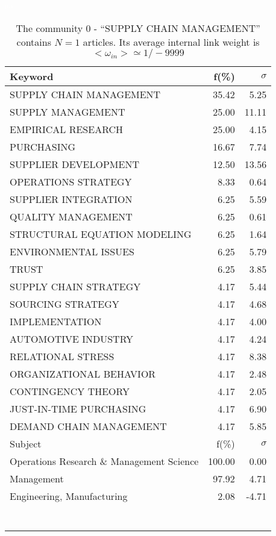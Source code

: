 \documentclass[a4paper,11pt]{report}
\begin{document}
\begin{landscape}
\begin{table}[!ht]
\caption{The community 0 - ``SUPPLY CHAIN MANAGEMENT'' contains $N = 1$ articles. Its average internal link weight is $<\omega_{in}> \simeq 1/-9999$ }
\textcolor{white}{aa}\\
{\scriptsize\begin{tabular}{|l r r|}
\hline
Keyword & f(\%) & $\sigma$\\
\hline
SUPPLY CHAIN MANAGEMENT & 35.42 & 5.25\\
SUPPLY MANAGEMENT & 25.00 & 11.11\\
EMPIRICAL RESEARCH & 25.00 & 4.15\\
PURCHASING & 16.67 & 7.74\\
SUPPLIER DEVELOPMENT & 12.50 & 13.56\\
OPERATIONS STRATEGY & 8.33 & 0.64\\
SUPPLIER INTEGRATION & 6.25 & 5.59\\
QUALITY MANAGEMENT & 6.25 & 0.61\\
STRUCTURAL EQUATION MODELING & 6.25 & 1.64\\
ENVIRONMENTAL ISSUES & 6.25 & 5.79\\
TRUST & 6.25 & 3.85\\
SUPPLY CHAIN STRATEGY & 4.17 & 5.44\\
SOURCING STRATEGY & 4.17 & 4.68\\
IMPLEMENTATION & 4.17 & 4.00\\
AUTOMOTIVE INDUSTRY & 4.17 & 4.24\\
RELATIONAL STRESS & 4.17 & 8.38\\
ORGANIZATIONAL BEHAVIOR & 4.17 & 2.48\\
CONTINGENCY THEORY & 4.17 & 2.05\\
JUST-IN-TIME PURCHASING & 4.17 & 6.90\\
DEMAND CHAIN MANAGEMENT & 4.17 & 5.85\\
\hline
\hline
Subject & f(\%) & $\sigma$\\
\hline
Operations Research \& Management Science & 100.00 & 0.00\\
Management & 97.92 & 4.71\\
Engineering, Manufacturing & 2.08 & -4.71\\
 &  & \\
 &  & \\
 &  & \\
 &  & \\
 &  & \\
 &  & \\
 &  & \\

\end{tabular}}
\end{table}
\end{landscape}
\end{document}
